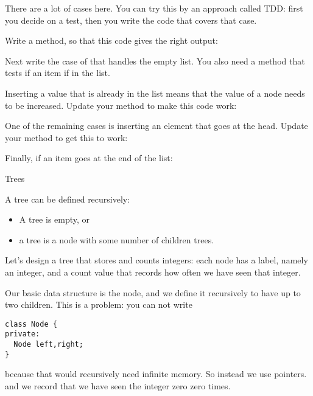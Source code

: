There are a lot of cases here. You can try this by an approach called
\acf{TDD}: first you decide on a test, then you write the code that
covers that case.

\begin{exercise}
  Write a  method, so that this code gives the right
  output:
\end{exercise}

\begin{exercise}
  Next write the case of  that handles the empty
  list. You also need a method  that tests if an
  item if in the list.
\end{exercise}

\begin{exercise}
  Inserting a value that is already in the list means that the
   value of a node needs to be increased. Update your
   method to make this code work:
\end{exercise}

\begin{exercise}
  One of the remaining cases is inserting an element that goes at the
  head. Update your  method to get this to work:
\end{exercise}

\begin{exercise}
  Finally, if an item goes at the end of the list:
\end{exercise}


 {Trees}

\prerequisite{\ref{ch:pointer}}

A tree can be defined recursively:
\begin{itemize}
\item A tree is empty, or
\item a tree is a node with some number of children trees.
\end{itemize}
Let's design a tree that stores and counts integers: each node has a
label, namely an integer, and a count value that records how often we
have seen that integer.

Our basic data structure is the node, and we define it recursively to
have up to two children. This is a problem: you can not write
\begin{verbatim}
class Node {
private:
  Node left,right;
}
\end{verbatim}
because that would recursively need infinite memory. So instead we use pointers.
%
%
and we record that we have seen the integer zero zero times.


